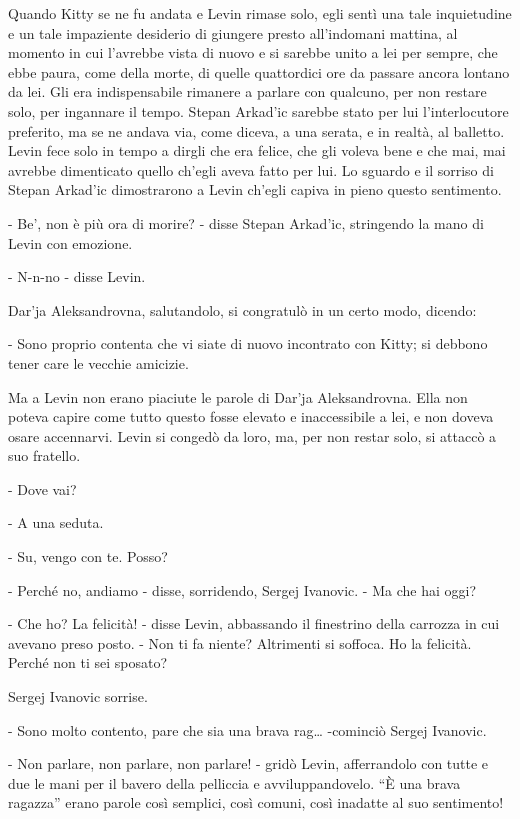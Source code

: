 \label{xiv-3} 

Quando Kitty se ne fu andata e Levin rimase solo, egli sentì una tale inquietudine e un tale impaziente desiderio di giungere presto all'indomani mattina, al momento in cui l'avrebbe vista di nuovo e si sarebbe unito a lei per sempre, che ebbe paura, come della morte, di quelle quattordici ore da passare ancora lontano da lei. Gli era indispensabile rimanere a parlare con qualcuno, per non restare solo, per ingannare il tempo. Stepan Arkad'ic sarebbe stato per lui l'interlocutore preferito, ma se ne andava via, come diceva, a una serata, e in realtà, al balletto. Levin fece solo in tempo a dirgli che era felice, che gli voleva bene e che mai, mai avrebbe dimenticato quello ch'egli aveva fatto per lui. Lo sguardo e il sorriso di Stepan Arkad'ic dimostrarono a Levin ch'egli capiva in pieno questo sentimento. 

- Be', non è più ora di morire? - disse Stepan Arkad'ic, stringendo la mano di Levin con emozione. 

- N-n-no - disse Levin. 

Dar'ja Aleksandrovna, salutandolo, si congratulò in un certo modo, dicendo: 

- Sono proprio contenta che vi siate di nuovo incontrato con Kitty; si debbono tener care le vecchie amicizie. 

Ma a Levin non erano piaciute le parole di Dar'ja Aleksandrovna. Ella non poteva capire come tutto questo fosse elevato e inaccessibile a lei, e non doveva osare accennarvi. Levin si congedò da loro, ma, per non restar solo, si attaccò a suo fratello. 

- Dove vai? 

- A una seduta. 

- Su, vengo con te. Posso? 

- Perché no, andiamo - disse, sorridendo, Sergej Ivanovic. - Ma che hai oggi? 

- Che ho? La felicità! - disse Levin, abbassando il finestrino della carrozza in cui avevano preso posto. - Non ti fa niente? Altrimenti si soffoca. Ho la felicità. Perché non ti sei sposato? 

Sergej Ivanovic sorrise. 

- Sono molto contento, pare che sia una brava rag\ldots{} -cominciò Sergej Ivanovic. 

- Non parlare, non parlare, non parlare! - gridò Levin, afferrandolo con tutte e due le mani per il bavero della pelliccia e avviluppandovelo. ``È una brava ragazza'' erano parole così semplici, così comuni, così inadatte al suo sentimento! 

